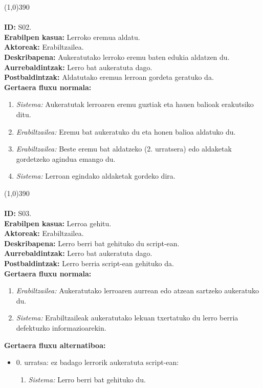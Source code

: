 \line(1,0){390}\\
\noindent\\
\textbf{ID:} S02.\\
\textbf{Erabilpen kasua:} Lerroko eremua aldatu.\\
\textbf{Aktoreak:} Erabiltzailea.\\
\textbf{Deskribapena:} Aukeratutako lerroko eremu baten edukia aldatzen du.\\
\textbf{Aurrebaldintzak:} Lerro bat aukeratuta dago.\\
\textbf{Postbaldintzak:} Aldatutako eremua lerroan gordeta geratuko da.\\
\textbf{Gertaera fluxu normala:}
\begin{enumerate}
	\item \textit{Sistema:} Aukeratutak lerroaren eremu guztiak eta hauen balioak erakutsiko ditu.
	\item \textit{Erabiltzailea:} Eremu bat aukeratuko du eta honen balioa aldatuko du.
	\item \textit{Erabiltzailea:} Beste eremu bat aldatzeko (2. urratsera) edo aldaketak gordetzeko agindua emango du.
	\item \textit{Sistema:} Lerroan egindako aldaketak gordeko dira.
\end{enumerate}
\line(1,0){390}\\
\noindent\\
\textbf{ID:} S03.\\
\textbf{Erabilpen kasua:} Lerroa gehitu.\\
\textbf{Aktoreak:} Erabiltzailea.\\
\textbf{Deskribapena:} Lerro berri bat gehituko du script-ean.\\
\textbf{Aurrebaldintzak:} Lerro bat aukeratuta dago.\\
\textbf{Postbaldintzak:} Lerro berria script-ean gehituko da.\\
\textbf{Gertaera fluxu normala:}
\begin{enumerate}
	\item \textit{Erabiltzailea:} Aukeratutako lerroaren aurrean edo atzean sartzeko aukeratuko du.
	\item \textit{Sistema:} Erabiltzaileak aukeratutako lekuan txertatuko du lerro berria defektuzko informazioarekin.
\end{enumerate}
\textbf{Gertaera fluxu alternatiboa:}
\begin{itemize}
	\item 0. urratsa: ez badago lerrorik aukeratuta script-ean:
		\begin{enumerate}
		\item \textit{Sistema:} Lerro berri bat gehituko du.
		\end{enumerate}
\end{itemize}
